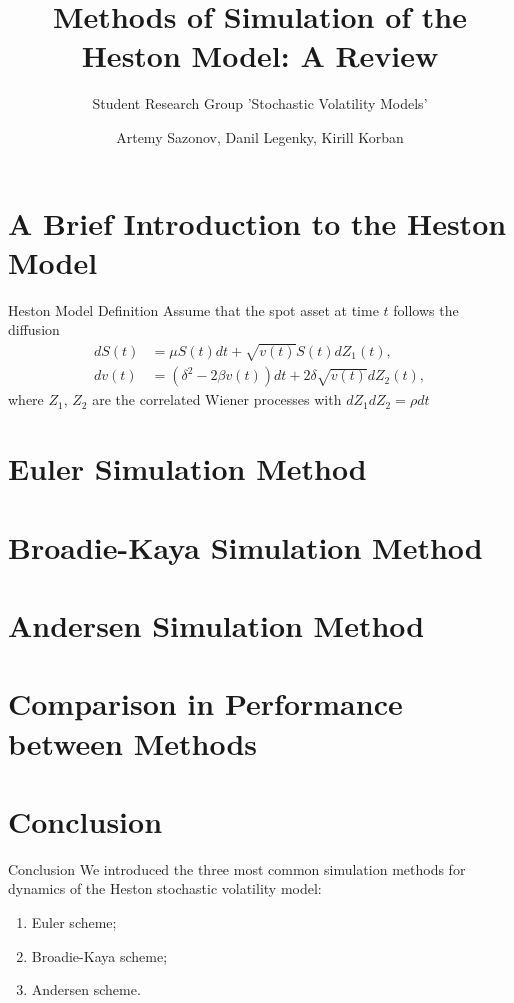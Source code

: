 \documentclass{vegapresentation}
\subtitle{Student Research Group 'Stochastic Volatility Models'}
\title{Methods of Simulation of the Heston Model: A Review}
\author{Artemy Sazonov, Danil Legenky, Kirill Korban}
\institute{Lomonosov Moscow State Univesity, Faculty of Mechanics and Mathematics}
\begin{document}
    \begin{frame}
        \maketitle
    \end{frame}

    \section{A Brief Introduction to the Heston Model}
        \begin{frame}{Heston Model Definition}
            Assume that the spot asset at time $t$ follows the diffusion
            \begin{align}
                dS(t) & = \mu S(t)dt + \sqrt{v(t)} S(t) dZ_1(t), \label{Heston:price}\\
                dv(t) & = \left(\delta^2 - 2\beta v(t)\right) dt + 2\delta \sqrt{v(t)} dZ_2(t), \label{Heston:variance}
            \end{align}
            where $Z_1$, $Z_2$ are the correlated Wiener processes with $dZ_1dZ_2 = \rho dt$
        \end{frame}

    \section{Euler Simulation Method}
        

    \section{Broadie-Kaya Simulation Method} 
        

    \section{Andersen Simulation Method}
        

    \section{Comparison in Performance between Methods}

    \section{Conclusion}
        \begin{frame}{Conclusion}
            We introduced the three most common simulation methods for dynamics of the Heston stochastic volatility model:
            \begin{enumerate}
                \item Euler scheme; \\
                \item Broadie-Kaya scheme; \\
                \item Andersen scheme.
            \end{enumerate}
        \end{frame}
\end{document}
